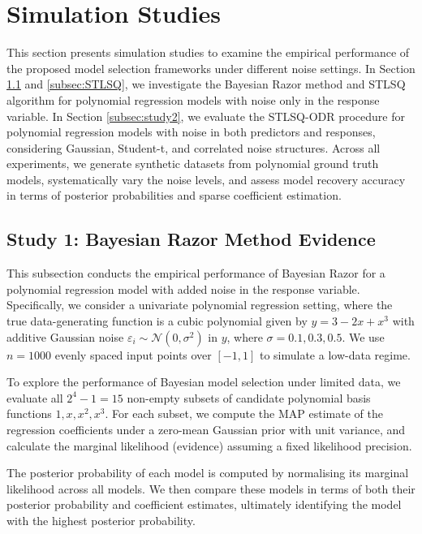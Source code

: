 \section{Simulation Studies}
\label{sec:simu}

This section presents simulation studies to examine the empirical performance of the proposed model selection frameworks under different noise settings. 
In Section \ref{subsec:study1} and \ref{subsec:STLSQ}, we investigate the Bayesian Razor method and STLSQ algorithm for polynomial regression models with noise only in the response variable. 
In Section \ref{subsec:study2}, we evaluate the STLSQ-ODR procedure for polynomial regression models with noise in both predictors and responses, considering Gaussian, Student-t, and correlated noise structures. Across all experiments, we generate synthetic datasets from polynomial ground truth models, systematically vary the noise levels, and assess model recovery accuracy in terms of posterior probabilities and sparse coefficient estimation.

\subsection{Study 1: Bayesian Razor Method Evidence}
\label{subsec:study1}

This subsection conducts the empirical performance of Bayesian Razor for a polynomial regression model with added noise in the response variable. 
Specifically, we consider a univariate polynomial regression setting, where the true data-generating function is a cubic polynomial given by $y = 3 - 2x + x^3$ with additive Gaussian noise $\varepsilon_i \sim \mathcal{N}(0, \sigma^2)$ in $y$, where $\sigma = 0.1, 0.3,0.5$. We use $n=1000$ evenly spaced input points over $[-1, 1]$ to simulate a low-data regime.

To explore the performance of Bayesian model selection under limited data, we evaluate all $2^4 - 1 = 15$ non-empty subsets of candidate polynomial basis functions ${1, x, x^2, x^3}$. For each subset, we compute the MAP estimate of the regression coefficients under a zero-mean Gaussian prior with unit variance, and calculate the marginal likelihood (evidence) assuming a fixed likelihood precision.


The posterior probability of each model is computed by normalising its marginal likelihood across all models. We then compare these models in terms of both their posterior probability and coefficient estimates, ultimately identifying the model with the highest posterior probability. 

